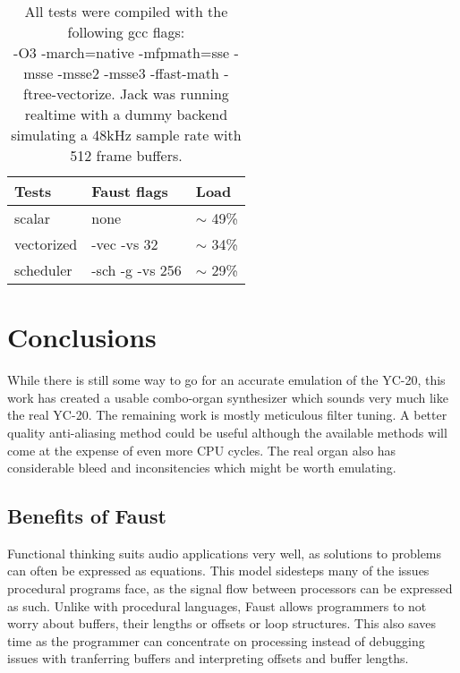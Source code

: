 \documentclass[11pt,a4paper]{article}
\begin{document}
\begin{table}[h]
 \begin{center}
\begin{tabular}{|l|l|l|}

      \hline
      Tests         & Faust flags & Load   \\
      \hline\hline
      scalar        & none & $\sim$ 49\% \\
      vectorized    & -vec -vs 32 & $\sim$ 34\% \\
      scheduler     & -sch -g -vs 256 & $\sim$ 29\% \\
      \hline

\end{tabular}
\caption{All tests were compiled with the following gcc flags: \\
-O3 -march=native -mfpmath=sse -msse -msse2 -msse3 -ffast-math -ftree-vectorize. Jack was running realtime with a dummy backend simulating a 48kHz sample rate with 512 frame buffers.
}\label{table:performance2}
 \end{center}
\end{table}



\section{Conclusions}

While there is still some way to go for an accurate emulation of the YC-20, this work has created a usable combo-organ synthesizer which sounds very much like the real YC-20.  The remaining work is mostly meticulous filter tuning. A better quality anti-aliasing method could be useful although the available methods will come at the expense of even more CPU cycles. The real organ also has considerable bleed and inconsitencies which might be worth emulating.

\subsection{Benefits of Faust}

Functional thinking suits audio applications very well, as solutions to problems can often be expressed as equations. This model sidesteps many of the issues procedural programs face, as the signal flow between processors can be expressed as such. Unlike with procedural languages, Faust allows programmers to not worry about buffers, their lengths or offsets or loop structures. This also saves time as the programmer can concentrate on processing instead of debugging issues with tranferring buffers and interpreting offsets and buffer lengths.
\end{document}

